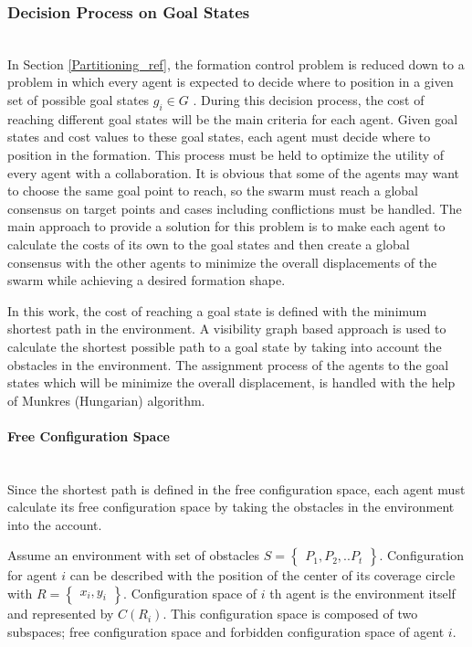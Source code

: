 \subsubsection{Decision Process on Goal States}\hspace{0pt} \label{DecisionProcess Ref} \\
In Section \ref{Partitioning_ref}, the formation control problem is reduced down to a problem in which every agent is expected to decide where to position in a given set of possible goal states $g_i \in G$ .  During this decision process, the cost of reaching different goal states will be the main criteria for each agent. Given goal states and cost values to these goal states, each agent must decide where to position in the formation. This process must be held to optimize the utility of every agent with a collaboration. It is obvious that some of the agents may want to choose the same goal point to reach, so the swarm must reach a global consensus on target points and cases including conflictions must be handled. The main approach to provide a solution for this problem is to make each agent to calculate the costs of its own to the goal states and then create a global consensus with the other agents to minimize the overall displacements of the swarm while achieving a desired formation shape. 

In this work, the cost of reaching a goal state is defined with the minimum shortest path in the environment. A visibility graph based approach is used to calculate the shortest possible path to a goal state by taking into account the obstacles in the environment. The assignment process of the agents to the goal states which will be minimize the overall displacement, is handled with the help of Munkres (Hungarian)  algorithm.
	
\paragraph{Free Configuration Space}\hspace{0pt} \\
Since the shortest path is defined in the free configuration space, each agent must calculate its free configuration space by taking the obstacles in the environment into the account. 

Assume an environment with set of obstacles $S = \begin{Bmatrix}
P_1, P_2, .. P_t \end{Bmatrix}$. Configuration for agent $i$ can be described with the position of the center of its coverage circle with $R=\begin{Bmatrix}x_i, y_i\end{Bmatrix}$. Configuration space of $i$ th agent is the environment itself and represented by $C(R_i)$. This configuration space is composed of two subspaces; free configuration space and forbidden configuration space of agent $i$.

